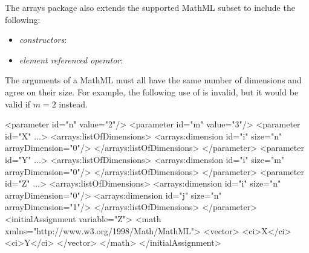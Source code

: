 The arrays package also extends the supported MathML subset to include the following:
\begin{itemize}
\item \emph{constructors}: 
\item \emph{element referenced operator}: 
\end{itemize}

The arguments of a MathML  must all have the same number of dimensions and agree on their size.  For example, the following use of  is invalid, but it would be valid if $m=2$ instead.
\begin{example}
<parameter id="n" value="2"/>
<parameter id="m" value="3"/>
<parameter id="X" ...>
  <arrays:listOfDimensions>
    <arrays:dimension id="i" size="n" arrayDimension="0"/>
  </arrays:listOfDimensions>
</parameter>
<parameter id="Y" ...>
  <arrays:listOfDimensions>
    <arrays:dimension id="i" size="m" arrayDimension="0"/>
  </arrays:listOfDimensions>
</parameter>
<parameter id="Z" ...>
  <arrays:listOfDimensions>
    <arrays:dimension id="i" size="n" arrayDimension="0"/>
    <arrays:dimension id="j" size="n" arrayDimension="1"/>
  </arrays:listOfDimensions>
</parameter>
<initialAssignment variable="Z"> 
 <math xmlns="http://www.w3.org/1998/Math/MathML">
  <vector> 
   <ci>X</ci> 
   <ci>Y</ci>
  </vector>
 </math>
</initialAssignment>
\end{example}

